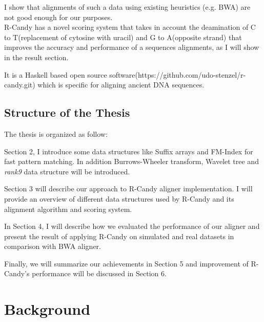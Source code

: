 \documentclass[11pt,a4paper]{report}
\begin{document}
I show that alignments of such a data using existing heuristics (e.g. BWA) are not good enough for our purposes.\\ 

R-Candy has a novel scoring system that takes in account the deamination of C to T(replacement of cytosine with uracil) and G to A(opposite strand) that improves the accuracy and performance of a sequences alignments, as I will show in the result section. 

It is a Haskell based open source software(https://github.com/udo-stenzel/r-candy.git) which is specific for aligning ancient DNA sequences.



\subsection{Structure of the Thesis}

The thesis is organized as follow:
 
Section 2, I introduce some data structures like Suffix arrays and FM-Index for fast pattern matching. In addition Burrows-Wheeler transform, Wavelet tree and \emph{rank9} data structure will be introduced.

Section 3 will describe our approach to R-Candy aligner implementation.
I will provide an overview of different data structures used by R-Candy and its alignment algorithm and scoring system.

In Section 4, I will describe how we evaluated the performance of our aligner and present the result of applying R-Candy on simulated and real datasets in comparison with BWA aligner.

Finally, we will summarize our achievements in Section 5 and improvement of R-Candy's performance will be discussed in Section 6. 




\clearpage


\section{Background }
\end{document}

